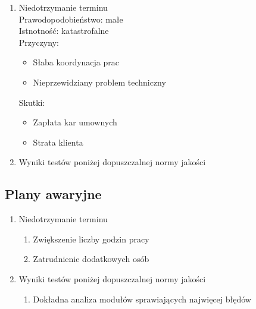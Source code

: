 \documentclass[12pt,a4paper]{article}
\begin{document}
\begin{enumerate}
    \item Niedotrzymanie terminu\\
    Prawodopodobieństwo: małe\\
    Istnotność: katastrofalne\\
    Przyczyny:
    \begin{itemize}
        \item Słaba koordynacja prac
        \item Nieprzewidziany problem techniczny
    \end{itemize}
    Skutki:
    \begin{itemize}
        \item Zapłata kar umownych
        \item Strata klienta
    \end{itemize}
    \item Wyniki testów poniżej dopuszczalnej normy jakości
\end{enumerate}


\subsection{Plany awaryjne}

\begin{enumerate}
    \item Niedotrzymanie terminu
        \begin{enumerate}
            \item Zwiększenie liczby godzin pracy
            \item Zatrudnienie dodatkowych osób
        \end{enumerate}
    \item Wyniki testów poniżej dopuszczalnej normy jakości
        \begin{enumerate}
            \item Dokładna analiza modułów sprawiających najwięcej błędów
        \end{enumerate}
\end{enumerate}
\end{document}
